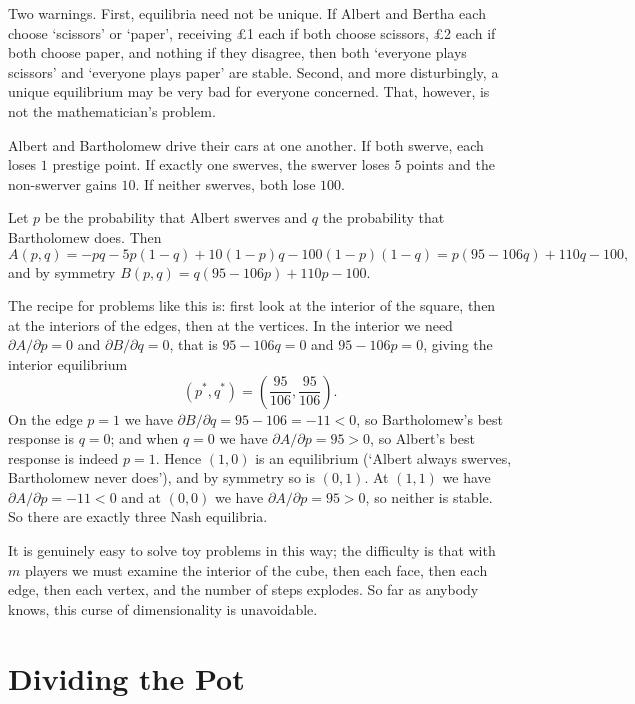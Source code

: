 \documentclass[a4paper]{scrartcl}
\begin{document}
Two warnings. First, equilibria need not be unique. If Albert and Bertha each choose `scissors' or `paper', receiving \pounds 1 each if both choose scissors, \pounds 2 each if both choose paper, and nothing if they disagree, then both `everyone plays scissors' and `everyone plays paper' are stable. Second, and more disturbingly, a unique equilibrium may be very bad for everyone concerned. That, however, is not the mathematician's problem.

\begin{example}[Chicken]
	Albert and Bartholomew drive their cars at one another. If both swerve, each loses $1$ prestige point. If exactly one swerves, the swerver loses $5$ points and the non-swerver gains $10$. If neither swerves, both lose $100$.

	Let $p$ be the probability that Albert swerves and $q$ the probability that Bartholomew does. Then
	$$A(p,q) = -pq - 5p(1-q) + 10(1-p)q - 100(1-p)(1-q) = p(95 - 106q) + 110q - 100,$$
	and by symmetry $B(p,q) = q(95-106p) + 110p - 100$.

	The recipe for problems like this is: first look at the interior of the square, then at the interiors of the edges, then at the vertices. In the interior we need $\partial A/\partial p = 0$ and $\partial B/\partial q = 0$, that is $95 - 106q = 0$ and $95-106p=0$, giving the interior equilibrium
	$$(p^*,q^*) = \left(\frac{95}{106},\frac{95}{106}\right).$$
	On the edge $p = 1$ we have $\partial B/\partial q = 95-106 = -11 < 0$, so Bartholomew's best response is $q = 0$; and when $q = 0$ we have $\partial A/\partial p = 95 > 0$, so Albert's best response is indeed $p=1$. Hence $(1,0)$ is an equilibrium (`Albert always swerves, Bartholomew never does'), and by symmetry so is $(0,1)$. At $(1,1)$ we have $\partial A /\partial p = -11 <0$ and at $(0,0)$ we have $\partial A/\partial p = 95 > 0$, so neither is stable. So there are exactly three Nash equilibria.
\end{example}

It is genuinely easy to solve toy problems in this way; the difficulty is that with $m$ players we must examine the interior of the cube, then each face, then each edge, then each vertex, and the number of steps explodes. So far as anybody knows, this curse of dimensionality is unavoidable.

\section{Dividing the Pot}
\end{document}
